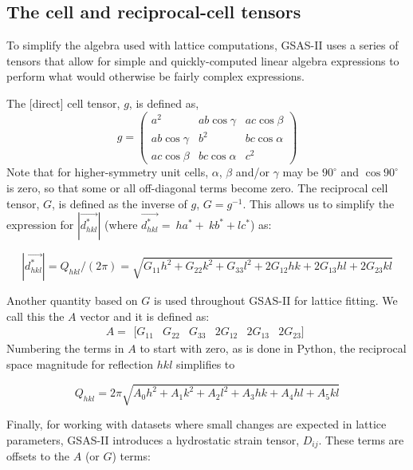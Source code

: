 \subsection{The cell and reciprocal-cell tensors}

To simplify the algebra used with lattice computations, GSAS-II uses a series of tensors that allow for simple and quickly-computed linear algebra expressions to perform what would otherwise be fairly complex expressions. 

The [direct] cell tensor, $g$, is defined as, 
$$
   g = \left( \begin{matrix}
   a^2 & a b\cos\gamma & a c\cos\beta \\
   a b\cos\gamma & b^2 & b c \cos\alpha \\
   a c\cos\beta &  b c \cos\alpha & c^2
   \end{matrix}\right)
$$
Note that for higher-symmetry unit cells, $\alpha$, $\beta$ and/or $\gamma$ may be $90^\circ$ and $\cos90^\circ$ is zero, so that some or all off-diagonal terms become zero. 
The reciprocal cell tensor, $G$, is defined as the inverse of $g$, $G = g^{-1}$. This allows us to simplify the expression for $|\vec{d_{hkl}^\ast}|$ (where $\vec{d_{hkl}^\ast}=\ ha^\ast+\ kb^\ast+lc^\ast$) as: 

$$|\vec{d_{hkl}^\ast}| =  Q_{hkl} / (2 \pi) =  \sqrt {G_{11} h^2 + G_{22} k^2 + G_{33} l^2 + 2 G_{12} hk + 2 G_{13} hl + 2 G_{23} kl}$$

Another quantity based on $G$ is used throughout GSAS-II for lattice fitting. We call this the $A$ vector and it is defined as:
$$ A = \begin{matrix} [ G_{11} & G_{22} & G_{33} & 2G_{12} & 2G_{13} & 2G_{23} ] \end{matrix}$$ 
Numbering the terms in $A$ to start with zero, as is done in Python, the reciprocal space magnitude for reflection $hkl$ simplifies to

$$Q_{hkl} = 2 \pi \sqrt {A_0 h^2 + A_1 k^2 + A_2 l^2 + A_3 hk + A_4 hl + A_5 kl}$$ 

Finally, for working with datasets where small changes are expected in lattice parameters, GSAS-II introduces a hydrostatic strain tensor, $D_{ij}$. These terms are offsets to the $A$ (or $G$) terms:\label{ref:Dij}

